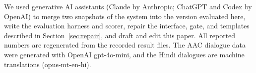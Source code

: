 We used generative AI assistants (Claude by Anthropic; ChatGPT and Codex by OpenAI) to merge two snapshots of the system into the version evaluated here, write the evaluation harness and scorer, repair the interface, gate, and templates described in Section~\ref{sec:repair}, and draft and edit this paper.
All reported numbers are regenerated from the recorded result files.
The AAC dialogue data were generated with OpenAI gpt-4o-mini, and the Hindi dialogues are machine translations (opus-mt-en-hi).
